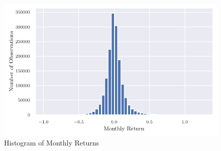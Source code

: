 	
	\begin{center}
		\begin{figure}
			\includegraphics{Figures/hist_returns.pdf}
			\caption{Histogram of Monthly Returns}
			\label{fig:hist_returns}
		\end{figure}
	\end{center}


		
	



